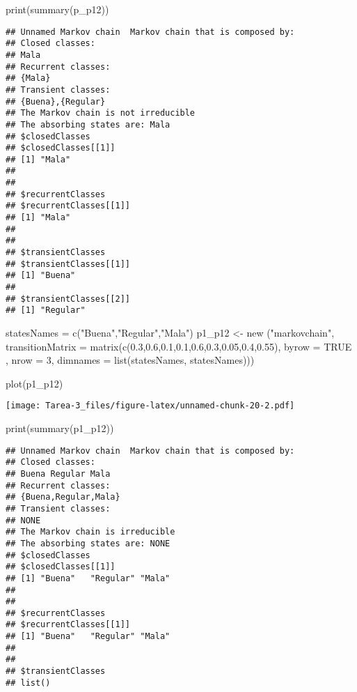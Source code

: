 \documentclass[
]{article}
\newenvironment{Shaded}{\begin{snugshade}}{\end{snugshade}}
\newcommand{\AttributeTok}[1]{\textcolor[rgb]{0.77,0.63,0.00}{#1}}
\newcommand{\ConstantTok}[1]{\textcolor[rgb]{0.00,0.00,0.00}{#1}}
\newcommand{\DecValTok}[1]{\textcolor[rgb]{0.00,0.00,0.81}{#1}}
\newcommand{\FloatTok}[1]{\textcolor[rgb]{0.00,0.00,0.81}{#1}}
\newcommand{\FunctionTok}[1]{\textcolor[rgb]{0.00,0.00,0.00}{#1}}
\newcommand{\NormalTok}[1]{#1}
\newcommand{\OtherTok}[1]{\textcolor[rgb]{0.56,0.35,0.01}{#1}}
\newcommand{\StringTok}[1]{\textcolor[rgb]{0.31,0.60,0.02}{#1}}
\begin{document}
\begin{Shaded}
\begin{Highlighting}[]
\FunctionTok{print}\NormalTok{(}\FunctionTok{summary}\NormalTok{(p\_p12))}
\end{Highlighting}
\end{Shaded}

\begin{verbatim}
## Unnamed Markov chain  Markov chain that is composed by: 
## Closed classes: 
## Mala 
## Recurrent classes: 
## {Mala}
## Transient classes: 
## {Buena},{Regular}
## The Markov chain is not irreducible 
## The absorbing states are: Mala
## $closedClasses
## $closedClasses[[1]]
## [1] "Mala"
## 
## 
## $recurrentClasses
## $recurrentClasses[[1]]
## [1] "Mala"
## 
## 
## $transientClasses
## $transientClasses[[1]]
## [1] "Buena"
## 
## $transientClasses[[2]]
## [1] "Regular"
\end{verbatim}

\begin{Shaded}
\begin{Highlighting}[]
\NormalTok{statesNames }\OtherTok{=} \FunctionTok{c}\NormalTok{(}\StringTok{"Buena"}\NormalTok{,}\StringTok{"Regular"}\NormalTok{,}\StringTok{"Mala"}\NormalTok{)}
\NormalTok{p1\_p12 }\OtherTok{\textless{}{-}} \FunctionTok{new}\NormalTok{ (}\StringTok{"markovchain"}\NormalTok{, }\AttributeTok{transitionMatrix =} \FunctionTok{matrix}\NormalTok{(}\FunctionTok{c}\NormalTok{(}\FloatTok{0.3}\NormalTok{,}\FloatTok{0.6}\NormalTok{,}\FloatTok{0.1}\NormalTok{,}\FloatTok{0.1}\NormalTok{,}\FloatTok{0.6}\NormalTok{,}\FloatTok{0.3}\NormalTok{,}\FloatTok{0.05}\NormalTok{,}\FloatTok{0.4}\NormalTok{,}\FloatTok{0.55}\NormalTok{), }\AttributeTok{byrow =} \ConstantTok{TRUE}\NormalTok{ , }\AttributeTok{nrow =} \DecValTok{3}\NormalTok{, }\AttributeTok{dimnames =} \FunctionTok{list}\NormalTok{(statesNames, statesNames)))}

\FunctionTok{plot}\NormalTok{(p1\_p12)}
\end{Highlighting}
\end{Shaded}

\texttt{[image: Tarea-3\_files/figure-latex/unnamed-chunk-20-2.pdf]}

\begin{Shaded}
\begin{Highlighting}[]
\FunctionTok{print}\NormalTok{(}\FunctionTok{summary}\NormalTok{(p1\_p12))}
\end{Highlighting}
\end{Shaded}

\begin{verbatim}
## Unnamed Markov chain  Markov chain that is composed by: 
## Closed classes: 
## Buena Regular Mala 
## Recurrent classes: 
## {Buena,Regular,Mala}
## Transient classes: 
## NONE 
## The Markov chain is irreducible 
## The absorbing states are: NONE
## $closedClasses
## $closedClasses[[1]]
## [1] "Buena"   "Regular" "Mala"   
## 
## 
## $recurrentClasses
## $recurrentClasses[[1]]
## [1] "Buena"   "Regular" "Mala"   
## 
## 
## $transientClasses
## list()
\end{verbatim}
\end{document}
